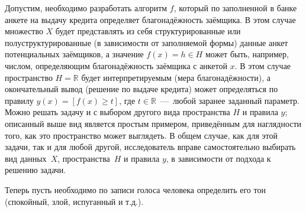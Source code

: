 Допустим, необходимо разработать алгоритм $f$, который по заполненной в банке анкете на выдачу кредита определяет благонадёжность заёмщика. В этом случае множество $X$ будет представлять из себя структурированные или полуструктурированные (в зависимости от заполняемой формы) данные анкет потенциальных заёмщиков, а значение $f(x) = h \in H$ может быть, например, числом, определяющим благонадёжность заёмщика с анкетой $x$. В этом случае пространство $H = \mathbb{R}$ будет интерпретируемым (мера благонадёжности), а окончательный вывод (решение по выдаче кредита) может определяться по правилу $y(x) = \left[f(x) \geq t\right]$, где $t \in \mathbb{R}$~---~любой заранее заданный параметр. Можно решать задачу и с выбором другого вида пространства $H$ и правила $y$; описанный выше вид является простым примером, приведённым для наглядности того, как это пространство может выглядеть. В общем случае, как для этой задачи, так и для любой другой, исследователь вправе самостоятельно выбирать вид данных~$X$, пространства~$H$ и правила $y$, в зависимости от подхода к решению задачи.

Теперь пусть необходимо по записи голоса человека определить его тон (спокойный, злой, испуганный и т.д.).






